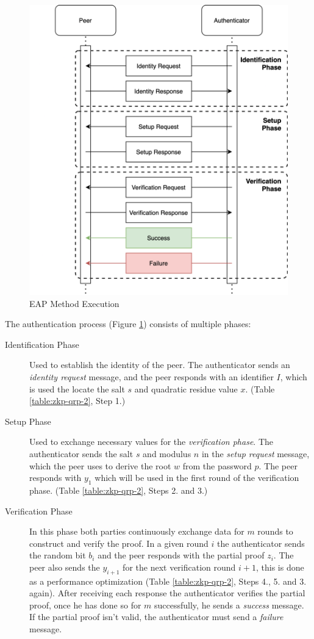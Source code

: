 \begin{figure}[h!]
	\centering
	\includegraphics[width=14cm]{images/eap-zkp}
	\caption{EAP Method Execution}
	\label{fig:eap-84}
\end{figure}

The authentication process (Figure \ref{fig:eap-84}) consists of multiple phases:

\begin{description}
	\item [Identification Phase] Used to establish the identity of the peer. The authenticator sends an \textit{identity request} message, and the peer responds with an identifier $I$, which is used the locate the salt $s$ and quadratic residue value $x$. (Table \ref{table:zkp-qrp-2}, Step 1.)
	\item [Setup Phase] Used to exchange necessary values for the \textit{verification phase}. The authenticator sends the salt $s$ and modulus $n$ in the \textit{setup request} message, which the peer uses to derive the root $w$ from the password $p$. The peer responds with $y_1$ which will be used in the first round of the verification phase. (Table \ref{table:zkp-qrp-2}, Steps 2. and 3.)
	\item [Verification Phase] In this phase both parties continuously exchange data for $m$ rounds to construct and verify the proof. In a given round $i$ the authenticator sends the random bit $b_i$ and the peer responds with the partial proof $z_i$. The peer also sends the $y_{i+1}$ for the next verification round $i+1$, this is done as a performance optimization (Table \ref{table:zkp-qrp-2}, Steps 4., 5. and 3. again). After receiving each response the authenticator verifies the partial proof, once he has done so for $m$ successfully, he sends a \textit{success} message. If the partial proof isn't valid, the authenticator must send a \textit{failure} message.
\end{description}

